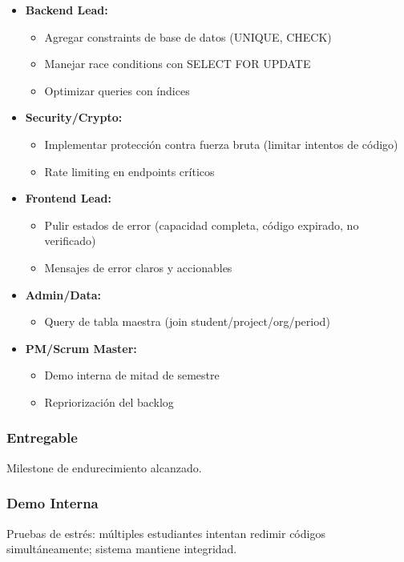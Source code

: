 \documentclass[12pt,a4paper]{article}
\begin{document}
\begin{itemize}[leftmargin=*]
    \item \textbf{Backend Lead:}
    \begin{itemize}
        \item Agregar constraints de base de datos (UNIQUE, CHECK)
        \item Manejar race conditions con SELECT FOR UPDATE
        \item Optimizar queries con índices
    \end{itemize}
    
    \item \textbf{Security/Crypto:}
    \begin{itemize}
        \item Implementar protección contra fuerza bruta (limitar intentos de código)
        \item Rate limiting en endpoints críticos
    \end{itemize}
    
    \item \textbf{Frontend Lead:}
    \begin{itemize}
        \item Pulir estados de error (capacidad completa, código expirado, no verificado)
        \item Mensajes de error claros y accionables
    \end{itemize}
    
    \item \textbf{Admin/Data:}
    \begin{itemize}
        \item Query de tabla maestra (join student/project/org/period)
    \end{itemize}
    
    \item \textbf{PM/Scrum Master:}
    \begin{itemize}
        \item Demo interna de mitad de semestre
        \item Repriorización del backlog
    \end{itemize}
\end{itemize}

\subsubsection{Entregable}
Milestone de endurecimiento alcanzado.

\subsubsection{Demo Interna}
Pruebas de estrés: múltiples estudiantes intentan redimir códigos simultáneamente; sistema mantiene integridad.
\end{document}
